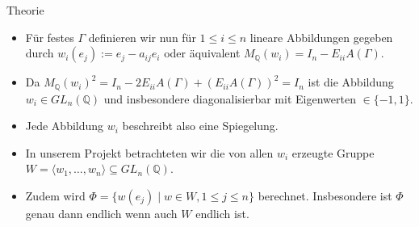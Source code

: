 \documentclass[9pt]{beamer}
\begin{document}
\begin{frame}{Theorie}
\begin{itemize}
\item Für festes $\Gamma$ definieren wir nun für $1 \leq i \leq n$ lineare Abbildungen gegeben durch $w_i(e_j) := e_j - a_{ij}e_i$ oder äquivalent $M_{\mathbb Q}(w_i) = I_n - E_{ii}A(\Gamma)$.
\item Da $M_{\mathbb Q}(w_i)^2 = I_n - 2E_{ii}A(\Gamma) + (E_{ii}A(\Gamma))^2 = I_n$ ist die Abbildung $w_i \in GL_n(\mathbb Q)$ und insbesondere diagonalisierbar mit Eigenwerten $\in \{-1,1\}$.
\item Jede Abbildung $w_i$ beschreibt also eine Spiegelung.
\item In unserem Projekt betrachteten wir die von allen $w_i$ erzeugte Gruppe $W = \langle w_1, \ldots, w_n \rangle \subseteq GL_n(\mathbb Q)$.
\item Zudem wird $\Phi = \{w(e_j) \mid w \in W, 1 \leq j \leq n\}$ berechnet. Insbesondere ist $\Phi$ genau dann endlich wenn auch $W$ endlich ist.
\end{itemize}
\end{frame}
\end{document}

